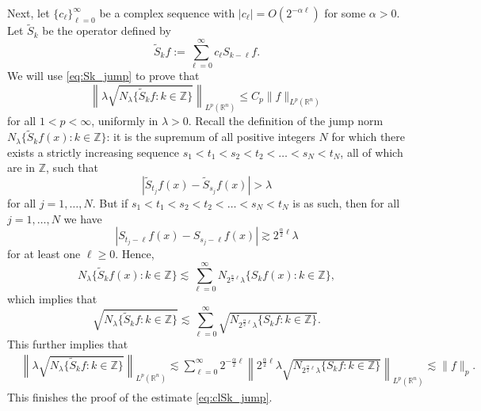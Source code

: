 \documentclass[12pt,leqno]{amsart}
\def\R{\mathbb{R}}
\def\Z{\mathbb{Z}}
\theoremstyle{plain}
\numberwithin{equation}{section}
\begin{document}
Next, let $\{c_{\ell}\}_{\ell=0}^{\infty}$ be a complex sequence with $|c_{\ell}| = O(2^{-\alpha \ell})$ for some $\alpha > 0$. Let $\tilde{S}_k$ be the operator defined by
\begin{equation} \label{eq:Tk_def}
\tilde{S}_k f := \sum_{\ell = 0}^{\infty} c_{\ell} S_{k-\ell} f.
\end{equation}
We will use \eqref{eq:Sk_jump}
 to prove that 
\begin{equation} \label{eq:clSk_jump}
\left\| \lambda \sqrt{N_{\lambda}\{ \tilde{S}_k f \colon k \in \Z \}} \right\|_{L^p(\R^n)} \leq C_p \|f\|_{L^p(\R^n)}
\end{equation}
for all $1 < p < \infty$, uniformly in $\lambda > 0$. Recall the definition of the jump norm $N_{\lambda}\{ \tilde{S}_k f(x) \colon k \in \Z \}$: it is the supremum of all positive integers $N$ for which there exists a strictly increasing sequence $s_1 < t_1 < s_2 < t_2 < \dots < s_N < t_N$, all of which are in $\Z$, such that 
\begin{equation} \label{eq:clSk_jump2}
|\tilde{S}_{t_j}f(x) - \tilde{S}_{s_j}f(x)| > \lambda
\end{equation}
for all $j=1,\dots,N$. But if $s_1 < t_1 < s_2 < t_2 < \dots < s_N < t_N$ is as such, then for all $j=1,\dots,N$ we have
\[
|S_{t_j-\ell}f(x) - S_{s_j-\ell}f(x)| \gtrsim 2^{\frac{\alpha}{2} \ell}\lambda
\]
for at least one $\ell \ge 0$.
Hence, 
\[
N_{\lambda}\{ \tilde{S}_k f(x) \colon k \in \Z \} \lesssim \sum_{\ell = 0}^{\infty} N_{2^{\frac{\alpha}{2} \ell}\lambda}\{ S_k f(x) \colon k \in \Z \},
\]
which implies that
\[
\sqrt{N_{\lambda}\{ \tilde{S}_k f \colon k \in \Z \}}\lesssim \sum_{\ell = 0}^{\infty} \sqrt{N_{2^{\frac{\alpha}{2} \ell}\lambda}\{ S_k f \colon k \in \Z \}}.
\]
This further implies that
\[
\begin{split}
& \left\| \lambda \sqrt{N_{\lambda}\{ \tilde{S}_k f \colon k \in \Z \}} \right\|_{L^p(\R^n)} \lesssim \sum_{\ell = 0}^{\infty} 2^{-\frac{\alpha}{2} \ell} \left\|2^{\frac{\alpha}{2} \ell}\lambda \sqrt{N_{2^{\frac{\alpha}{2} \ell}\lambda}\{ S_k f \colon k \in \Z \}}\right\|_{L^p(\R^n)} \lesssim \|f\|_p.
\end{split}
\]
This finishes the proof of the estimate \eqref{eq:clSk_jump}. \\
\end{document}
